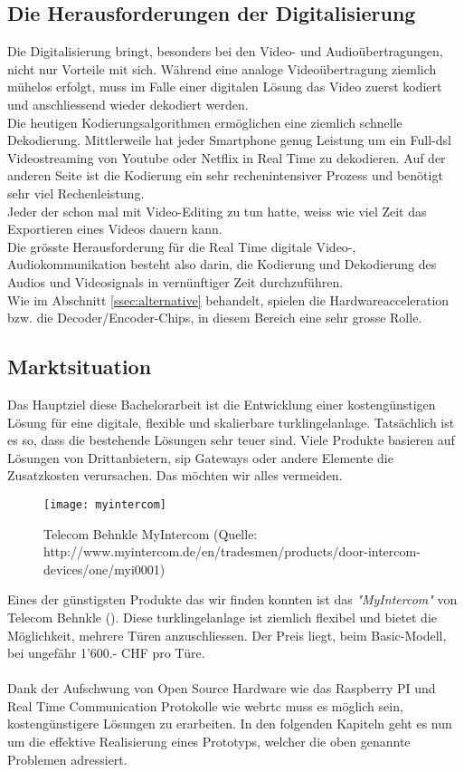\subsection{Die Herausforderungen der Digitalisierung}
Die Digitalisierung bringt, besonders bei den Video- und Audioübertragungen, nicht nur Vorteile mit sich.  Während eine analoge Videoübertragung ziemlich mühelos erfolgt, muss im Falle einer digitalen Lösung das Video zuerst kodiert und anschliessend wieder dekodiert werden.
\\
Die heutigen Kodierungsalgorithmen ermöglichen eine ziemlich schnelle Dekodierung. Mittlerweile hat jeder Smartphone genug Leistung um ein Full-\gls{dsl} Videostreaming von Youtube oder Netflix in Real Time zu dekodieren. Auf der anderen Seite ist die Kodierung ein sehr rechenintensiver Prozess und benötigt sehr viel Rechenleistung.
\\
Jeder der schon mal mit Video-Editing zu tun hatte, weiss wie viel Zeit das Exportieren eines Videos dauern kann.
\\
Die grösste Herausforderung für die Real Time digitale Video-, Audiokommunikation besteht also darin, die Kodierung und Dekodierung des Audios und Videosignals in vernünftiger Zeit durchzuführen.
\\
Wie im Abschnitt \ref{ssec:alternative} behandelt, spielen die Hardwareacceleration bzw. die Decoder/Encoder-Chips, in diesem Bereich eine sehr grosse Rolle.  

\subsection{Marktsituation}
\label{sec:marktsituation}
Das Hauptziel diese Bachelorarbeit ist die Entwicklung einer kostengünstigen Lösung für eine digitale, flexible und skalierbare \gls{turklingelanlage}. Tatsächlich ist es so, dass die bestehende Lösungen sehr teuer sind. Viele Produkte basieren auf Lösungen von Drittanbietern, \gls{sip} Gateways oder andere Elemente die Zusatzkosten verursachen. Das möchten wir alles vermeiden.

\begin{figure}[htb!]
	\begin{center}
		\texttt{[image: myintercom]}
		\caption[Telecom Behnkle MyIntercom]{Telecom Behnkle MyIntercom (Quelle: http://www.myintercom.de/en/tradesmen/products/door-intercom-devices/one/myi0001)}
		\label{fig:myintercom}
	\end{center}
\end{figure}

Eines der günstigsten Produkte das wir finden konnten ist das \textit{"MyIntercom"} von Telecom Behnkle (). Diese \gls{turklingelanlage} ist ziemlich flexibel und bietet die Möglichkeit, mehrere Türen anzuschliessen. Der Preis liegt, beim Basic-Modell, bei ungefähr 1’600.- CHF pro Türe.
\\
\\
Dank der Aufschwung von Open Source Hardware wie das Raspberry PI und Real Time Communication Protokolle wie \gls{webrtc} muss es möglich sein, kostengünstigere Lösungen zu erarbeiten. In den folgenden Kapiteln geht es nun um die effektive Realisierung eines Prototyps, welcher die oben genannte Problemen adressiert.
\newpage